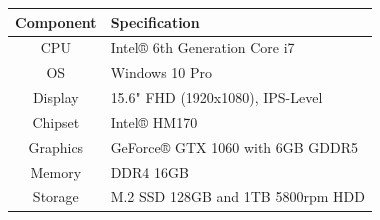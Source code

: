 \documentclass[12pt]{article}
\begin{document}
\begin{longtable}[]{@{}cl@{}}
\toprule
\begin{minipage}[b]{0.21\columnwidth}\centering\strut
Component\strut
\end{minipage} & \begin{minipage}[b]{0.43\columnwidth}\raggedright\strut
Specification\strut
\end{minipage}\tabularnewline
\midrule
\endhead
\begin{minipage}[t]{0.21\columnwidth}\centering\strut
CPU\strut
\end{minipage} & \begin{minipage}[t]{0.43\columnwidth}\raggedright\strut
Intel® 6th Generation Core i7\strut
\end{minipage}\tabularnewline
\begin{minipage}[t]{0.21\columnwidth}\centering\strut
OS\strut
\end{minipage} & \begin{minipage}[t]{0.43\columnwidth}\raggedright\strut
Windows 10 Pro\strut
\end{minipage}\tabularnewline
\begin{minipage}[t]{0.21\columnwidth}\centering\strut
Display\strut
\end{minipage} & \begin{minipage}[t]{0.43\columnwidth}\raggedright\strut
15.6" FHD (1920x1080), IPS-Level\strut
\end{minipage}\tabularnewline
\begin{minipage}[t]{0.21\columnwidth}\centering\strut
Chipset\strut
\end{minipage} & \begin{minipage}[t]{0.43\columnwidth}\raggedright\strut
Intel® HM170\strut
\end{minipage}\tabularnewline
\begin{minipage}[t]{0.21\columnwidth}\centering\strut
Graphics\strut
\end{minipage} & \begin{minipage}[t]{0.43\columnwidth}\raggedright\strut
GeForce® GTX 1060 with 6GB GDDR5\strut
\end{minipage}\tabularnewline
\begin{minipage}[t]{0.21\columnwidth}\centering\strut
Memory\strut
\end{minipage} & \begin{minipage}[t]{0.43\columnwidth}\raggedright\strut
DDR4 16GB\strut
\end{minipage}\tabularnewline
\begin{minipage}[t]{0.21\columnwidth}\centering\strut
Storage\strut
\end{minipage} & \begin{minipage}[t]{0.43\columnwidth}\raggedright\strut
M.2 SSD 128GB and 1TB 5800rpm HDD\strut
\end{minipage}\tabularnewline
\bottomrule
\end{longtable}
\end{document}
